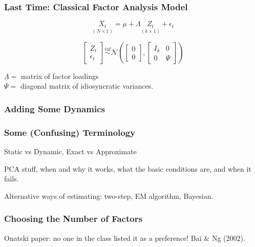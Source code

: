 \documentclass[handout]{beamer}
\begin{document}
\begin{frame}[c]\frametitle{Last Time: Classical Factor Analysis Model}
    
$$\underset{(N\times 1)}{X_t} = \mu + \Lambda \underset{(k\times 1)}{Z_t} + \epsilon_t$$

\vspace{2em}

\small

$$
\left[ \begin{array}
	{c} Z_t \\ \epsilon_t
\end{array}\right]
\overset{iid}{\sim} \mathcal{N}\left(
\left[ \begin{array}
	{c} 0\\ 0 
\end{array}\right],
\left[ \begin{array}
	{cc} I_k & 0\\
	0 & \Psi
\end{array}\right]\right)$$
\vspace{1em}

$\Lambda = $ matrix of factor loadings\\
$\Psi = $ diagonal matrix of idiosyncratic variances.
\end{frame}
\begin{frame}
	\frametitle{Adding Some Dynamics}
\end{frame}
\begin{frame}[c]\frametitle{Some (Confusing) Terminology}
    
Static vs Dynamic, Exact vs Approximate

\end{frame}

\begin{frame}
	PCA stuff, when and why it works, what the basic conditions are, and when it fails.
\end{frame}
\begin{frame}
	Alternative ways of estimating: two-step, EM algorithm, Bayesian.
\end{frame}
\begin{frame}
	\frametitle{Choosing the Number of Factors}
	Onatski paper: no one in the class listed it as a preference! Bai \& Ng (2002).
\end{frame}
\end{document}
